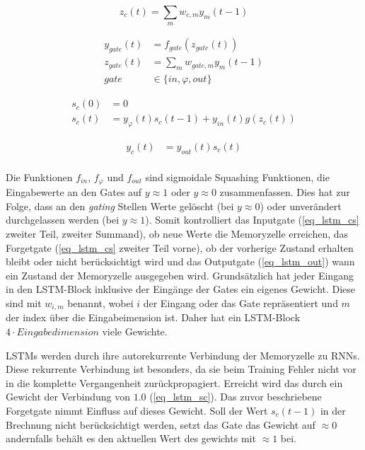 \begin{equation}
\label{eq_lstm_in}
z_{c}(t) = \sum \limits_{m} w_{c,m}y_m(t-1)
\end{equation}

\begin{equation}
\label{eq_lstm_gate}
\begin{split}
y_{gate}(t) &= f_{gate}(z_{gate}(t))\\
z_{gate}(t) &= \sum \limits_{m} w_{gate,m}y_m(t-1)\\
gate &\in \{in,\varphi,out\}
\end{split}
\end{equation}

\begin{equation}
\label{eq_lstm_cs}
\begin{split}
s_{c}(0) &= 0\\
s_{c}(t) &= y_{\varphi}(t)s_{c}(t-1) +
y_{in}(t)g(z_{c}(t))
\end{split}
\end{equation}

\begin{equation}
\label{eq_lstm_out}
\begin{split}
y_{c}(t) &= y_{out}(t)s_{c}(t)\\
\end{split}
\end{equation}

Die Funktionen $f_{in}$, $f_{\varphi}$ und $f_{out}$ sind sigmoidale Squashing
Funktionen, die Eingabewerte an den Gates auf $y\approx1$ oder $y\approx0$
zusammenfassen. Dies hat zur Folge, dass an den \textit{gating} Stellen Werte
gelöscht (bei $y\approx0$) oder unverändert durchgelassen werden (bei
$y\approx1$). Somit kontrolliert das Inputgate (\autoref{eq_lstm_cs} zweiter
Teil, zweiter Summand), ob neue Werte die Memoryzelle erreichen, das Forgetgate
(\autoref{eq_lstm_cs} zweiter Teil vorne), ob der vorherige Zustand erhalten
bleibt oder nicht berücksichtigt wird und das Outputgate (\autoref{eq_lstm_out})
wann ein Zustand der Memoryzelle ausgegeben wird. Grundsätzlich hat jeder
Eingang in den \ac{LSTM}-Block inklusive der Eingänge der Gates ein eigenes
Gewicht. Diese sind mit $w_{i,m}$ benannt, wobei $i$ der Eingang oder das Gate
repräsentiert und $m$ der index über die Eingabeimension ist. Daher hat ein
\ac{LSTM}-Block $4\cdot Eingabedimension$ viele Gewichte. 

\acp{LSTM} werden durch ihre autorekurrente Verbindung der Memoryzelle zu
\acp{RNN}. Diese rekurrente Verbindung ist besonders, da sie beim Training
Fehler nicht vor in die komplette Vergangenheit zurückpropagiert. Erreicht wird
das durch ein Gewicht der Verbindung von $1.0$ (\autoref{eq_lstm_sc}). Das zuvor
beschriebene Forgetgate nimmt Einfluss auf dieses Gewicht. Soll der Wert
$s_c(t-1)$ in der Brechnung nicht berücksichtigt werden, setzt das Gate das
Gewicht auf $\approx0$ andernfalls behält es den aktuellen Wert des gewichts mit
$\approx1$ bei. 

